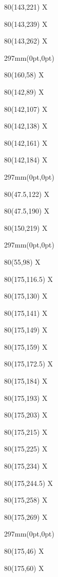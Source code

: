 \documentclass[a4paper]{article}
\newcommand{\text}[4]{\begin{textblock}{#3}(#2,#1)
{\large #4}
\end{textblock}}
\newcommand{\insertpage}[1]{\begin{textblock*}{297mm}(0pt,0pt)%
	\end{textblock*}%
}
\begin{document}
	\text{221}{143}{80}{\Large X}
	\text{239}{143}{80}{\Large X}
	\text{262}{143}{80}{\Large X}
	
	\newpage
	\insertpage{5}
	\text{58}{160}{80}{\Large X}
	
	\text{89}{142}{80}{\Large X}
	\text{107}{142}{80}{\Large X}
	\text{138}{142}{80}{\Large X}
	\text{161}{142}{80}{\Large X}
	\text{184}{142}{80}{\Large X}
	
	\newpage
	\insertpage{6}
	\text{122}{47.5}{80}{\Large X}
	\text{190}{47.5}{80}{\Large X}
	\text{219}{150}{80}{\Large X}
	
	\newpage
	\insertpage{7}
	\text{98}{55}{80}{\Large X}
	
	\text{116.5}{175}{80}{\Large X}
	\text{130}{175}{80}{\Large X}
	\text{141}{175}{80}{\Large X}
	\text{149}{175}{80}{\Large X}
	\text{159}{175}{80}{\Large X}
	\text{172.5}{175}{80}{\Large X}
	\text{184}{175}{80}{\Large X}
	\text{193}{175}{80}{\Large X}
	\text{203}{175}{80}{\Large X}
	\text{215}{175}{80}{\Large X}
	\text{225}{175}{80}{\Large X}
	\text{234}{175}{80}{\Large X}
	\text{244.5}{175}{80}{\Large X}
	\text{258}{175}{80}{\Large X}
	\text{269}{175}{80}{\Large X}
	
	\newpage
	\insertpage{8}
	\text{46}{175}{80}{\Large X}
	\text{60}{175}{80}{\Large X}
	
\end{document}
